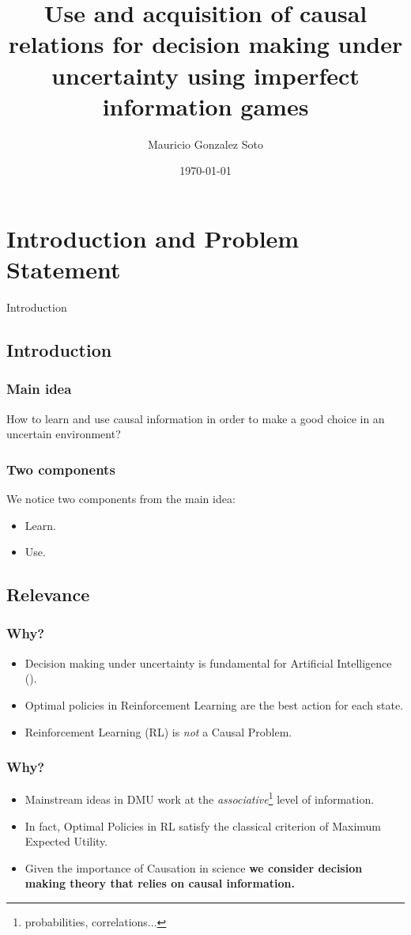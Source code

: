 \documentclass{beamer}
\title{Use and acquisition of causal relations for decision making under uncertainty using imperfect information games} %
\author{Mauricio Gonzalez Soto} %
\institute[INAOE] %
{
Instituto Nacional de Astrofísica Óptica y Electrónica \\ %
\medskip
\textit{mauricio@inaoep.mx} %
}
\date{\today} %
\theoremstyle{plain}
\begin{document}
\begin{frame}
\titlepage %
\end{frame}

\begin{frame}
\tableofcontents
\end{frame}

\section{Introduction and Problem Statement}
\begin{frame}
\begin{center}
\LARGE{Introduction}
\end{center}
\end{frame}
\subsection{Introduction}
\begin{frame}
\frametitle{Main idea}
How to learn and use causal information in order to make a good choice in an uncertain environment?
\end{frame}

\begin{frame}
\frametitle{Two components}
We notice two components from the main idea:
\begin{itemize}
\item Learn.
\item Use.
\end{itemize}
\end{frame}

\subsection{Relevance}
\begin{frame}
\frametitle{Why?}
\begin{itemize}
\item Decision making under uncertainty is fundamental for Artificial Intelligence (\cite{lake2017building}).
\item Optimal policies in Reinforcement Learning are the best action for each state.
\item Reinforcement Learning (RL) is \textit{not} a Causal Problem.
\end{itemize}
\end{frame}

\begin{frame}
\frametitle{Why?}
\begin{itemize}
\item Mainstream ideas in DMU work at the \textit{associative}\footnote{probabilities, correlations...} level of information.
\item In fact, Optimal Policies in RL satisfy the classical criterion of Maximum Expected Utility.
\item Given the importance of Causation in science \textbf{we consider decision making theory that relies on causal information.}
\end{itemize}
\end{frame}
\end{document}
